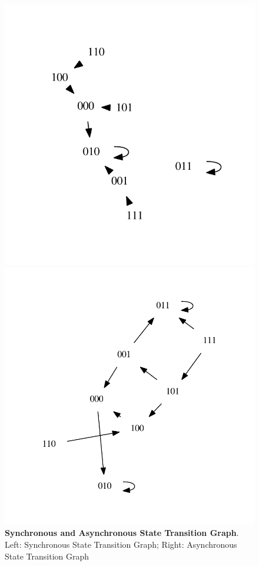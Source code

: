 \begin{figure}[h]
  \centering
 \begin{varwidth}{\linewidth}
    \includegraphics[scale=.7]{./Bilder/example01_synchron_stg}
  \end{varwidth} %
  \begin{varwidth}{\linewidth}
    \includegraphics[scale=.6]{./Bilder/example01_asynchron_stg}
  \end{varwidth}
  \caption[Synchronous and Asynchronous State Transition Graph]{\textbf{Synchronous and Asynchronous State Transition Graph}. Left: Synchronous State Transition Graph; Right: Asynchronous State Transition Graph}
\label{fig:Fig.4.}
\end{figure}


